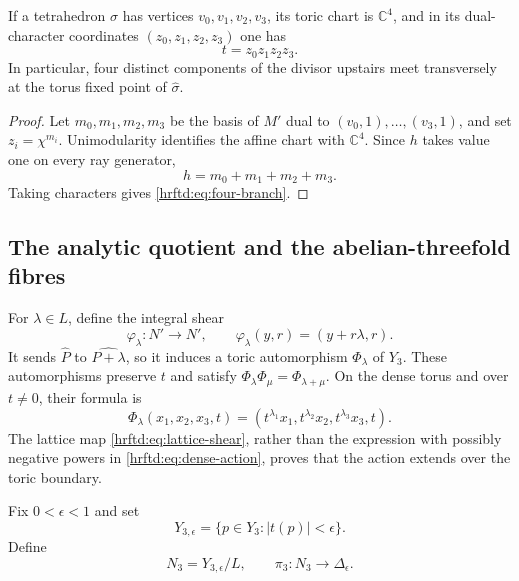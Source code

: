 \begin{proposition}
\label{hrftd:prop:four-branch}
If a tetrahedron \(\sigma\) has vertices \(v_0,v_1,v_2,v_3\), its toric
chart is \(\mathbb C^4\), and in its dual-character coordinates
\((z_0,z_1,z_2,z_3)\) one has
\begin{equation}
 t=z_0z_1z_2z_3.
 \label{hrftd:eq:four-branch}
\end{equation}
In particular, four distinct components of the divisor upstairs meet
transversely at the torus fixed point of \(\widehat\sigma\).
\end{proposition}

\begin{proof}
Let \(m_0,m_1,m_2,m_3\) be the basis of \(M'\) dual to
\((v_0,1),\ldots,(v_3,1)\), and set \(z_i=\chi^{m_i}\).
Unimodularity identifies the affine chart with \(\mathbb C^4\).
Since \(h\) takes value one on every ray generator,
\[
 h=m_0+m_1+m_2+m_3.
\]
Taking characters gives \eqref{hrftd:eq:four-branch}.
\end{proof}

\subsection{The analytic quotient and the abelian-threefold fibres}
\label{hrftd:quotient}

For \(\lambda\in L\), define the integral shear
\begin{equation}
 \varphi_\lambda:N'\longrightarrow N',
 \qquad
 \varphi_\lambda(y,r)=(y+r\lambda,r).
 \label{hrftd:eq:lattice-shear}
\end{equation}
It sends \(\widehat P\) to \(\widehat{P+\lambda}\), so it induces a toric
automorphism \(\Phi_\lambda\) of \(Y_3\).  These automorphisms preserve \(t\)
and satisfy
\(\Phi_\lambda\Phi_\mu=\Phi_{\lambda+\mu}\).
On the dense torus and over \(t\ne0\), their formula is
\begin{equation}
 \Phi_\lambda(x_1,x_2,x_3,t)
 =
 (t^{\lambda_1}x_1,t^{\lambda_2}x_2,t^{\lambda_3}x_3,t).
 \label{hrftd:eq:dense-action}
\end{equation}
The lattice map \eqref{hrftd:eq:lattice-shear}, rather than the expression
with possibly negative powers in \eqref{hrftd:eq:dense-action}, proves that
the action extends over the toric boundary.

Fix \(0<\epsilon<1\) and set
\[
 Y_{3,\epsilon}=\{p\in Y_3:|t(p)|<\epsilon\}.
\]
Define
\begin{equation}
 N_3=Y_{3,\epsilon}/L,\qquad
 \pi_3:N_3\longrightarrow\Delta_\epsilon.
 \label{hrftd:eq:analytic-quotient}
\end{equation}

